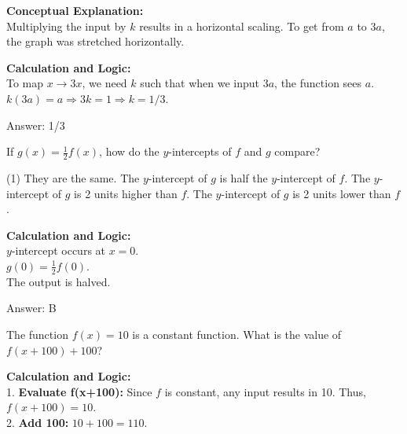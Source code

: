 \documentclass[11pt,paper=a4,answers]{exam}
\begin{document}
\begin{questions}
\begin{solution}
\textbf{Conceptual Explanation:} \\
Multiplying the input by $k$ results in a horizontal scaling. To get from $a$ to $3a$, the graph was stretched horizontally.

\vspace{20pt}

\textbf{Calculation and Logic:} \\
To map $x \rightarrow 3x$, we need $k$ such that when we input $3a$, the function sees $a$. \\
$k(3a) = a \Rightarrow 3k = 1 \Rightarrow k = 1/3$.

\vspace{25pt}

Answer: \colorbox{yellow!100}{1/3}
\end{solution}

\vspace{40pt}

\question

If $g(x) = \frac{1}{2}f(x)$, how do the $y$-intercepts of $f$ and $g$ compare?
\begin{tasks}(1)
    \task They are the same.
    \task The $y$-intercept of $g$ is half the $y$-intercept of $f$.
    \task The $y$-intercept of $g$ is 2 units higher than $f$.
    \task The $y$-intercept of $g$ is 2 units lower than $f$.
\end{tasks}

\begin{solution}
\textbf{Calculation and Logic:} \\
$y$-intercept occurs at $x=0$. \\
$g(0) = \frac{1}{2}f(0)$. \\
The output is halved.

\vspace{25pt}

Answer: \colorbox{yellow!100}{B}
\end{solution}

\vspace{40pt}

\question
The function $f(x) = 10$ is a constant function. What is the value of $f(x+100) + 100$?

\begin{solution}
\textbf{Calculation and Logic:} \\
1. \textbf{Evaluate f(x+100):} Since $f$ is constant, any input results in 10. Thus, $f(x+100) = 10$. \\
2. \textbf{Add 100:} $10 + 100 = 110$.


\end{solution}
\end{questions}
\end{document}
